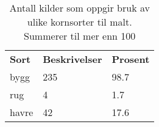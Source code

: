 \begin{table}
\begin{center}
\begin{tabular}{|l|l|l|}
\hline
\textbf{Sort} & \textbf{Beskrivelser} & \textbf{Prosent}\\
bygg & 235 & 98.7\\
rug & 4 & 1.7\\
havre & 42 & 17.6\\
\hline
\end{tabular}
\caption{
Antall kilder som oppgir bruk av ulike kornsorter til malt.
Summerer til mer enn 100%
}\label{tbl-grain-table-country}
\end{center}
\end{table}
